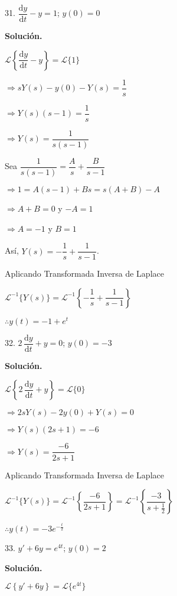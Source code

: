 \documentclass[fleqn]{article}
\begin{document}
    31. $ \dfrac{\mathrm{d} y}{\mathrm{d} t} - y = 1 $; $ y(0) = 0 $

    \textbf{Solución.}

    $ \mathscr{L} \left\lbrace \dfrac{\mathrm{d} y}{\mathrm{d} t} - y \right\rbrace = \mathscr{L} \lbrace 1 \rbrace $

    $ \Longrightarrow s Y(s) - y(0) - Y(s) = \dfrac{1}{s} $

    $ \Longrightarrow Y(s)(s - 1) = \dfrac{1}{s} $

    $ \Longrightarrow Y(s) = \dfrac{1}{s(s - 1)} $

    Sea $ \dfrac{1}{s(s - 1)} = \dfrac{A}{s} + \dfrac{B}{s - 1} $

    $ \Longrightarrow 1 = A(s-1) + Bs = s(A + B) - A $

    $ \Longrightarrow A + B = 0 $ y $ -A = 1 $

    $ \Longrightarrow A = -1 $ y $ B = 1 $

    Así, $ Y(s) = -\dfrac{1}{s} + \dfrac{1}{s - 1} $.

    Aplicando Transformada Inversa de Laplace

    $ \mathscr{L}^{-1} \lbrace Y(s) \rbrace = \mathscr{L}^{-1} \left\lbrace -\dfrac{1}{s} + \dfrac{1}{s - 1} \right\rbrace $

    $ \therefore y(t) = -1 + e^t $

    32. $ 2 \, \dfrac{\mathrm{d} y}{\mathrm{d} t} + y = 0 $; $ y(0) = -3 $

    \textbf{Solución.}

    $ \mathscr{L} \left\lbrace 2 \, \dfrac{\mathrm{d} y}{\mathrm{d} t} + y \right\rbrace = \mathscr{L} \lbrace 0 \rbrace $

    $ \Longrightarrow 2s Y(s) - 2y(0) + Y(s) = 0 $

    $ \Longrightarrow Y(s)(2s + 1) = -6 $

    $ \Longrightarrow Y(s) = \dfrac{-6}{2s + 1} $

    Aplicando Transformada Inversa de Laplace

    $ \mathscr{L}^{-1} \lbrace Y(s) \rbrace = \mathscr{L}^{-1} \left\lbrace \dfrac{-6}{2s + 1} \right\rbrace = \mathscr{L}^{-1} \left\lbrace \dfrac{-3}{s + \frac{1}{2}} \right\rbrace $

    $ \therefore y(t) = -3 e^{- \frac{t}{2}} $

    33. $ y' + 6y = e^{4t} $; $ y(0) = 2 $

    \textbf{Solución.}

    $ \mathscr{L} \left\lbrace y' + 6y \right\rbrace = \mathscr{L} \lbrace e^{4t} \rbrace $
\end{document}
